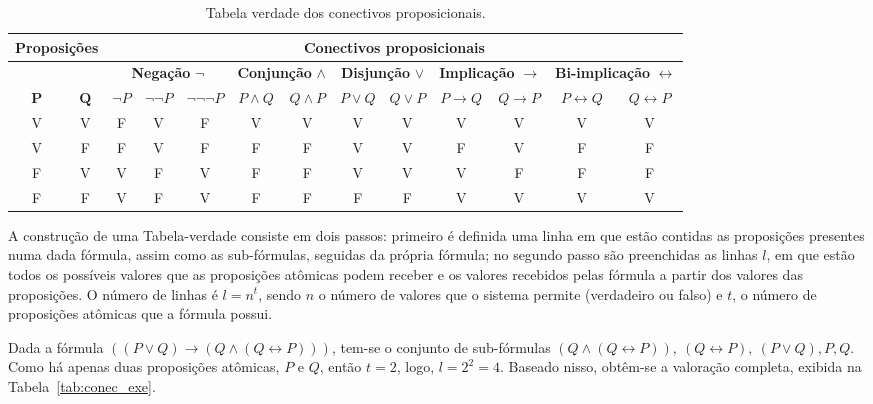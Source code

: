 \begin{table}[!ht]
	\centering\tiny{
		\caption{Tabela verdade dos conectivos proposicionais. \label{tab:conectivos}}
\begin{tabular}{|c|c|c|c|c|c|c|c|c|c|c|c|c|}
	\hline 
	\multicolumn{2}{|c|}{\textbf{Proposições}}  & \multicolumn{11}{c|}{\textbf{Conectivos proposicionais}} \\ 
	\hline
	\multicolumn{2}{|c|}{} 
	& \multicolumn{3}{c|}{\textbf{Negação} $\neg$} & \multicolumn{2}{c|}{\textbf{Conjunção} $\wedge$}  & \multicolumn{2}{c|}{\textbf{Disjunção} $\vee$}  & \multicolumn{2}{c|}{\textbf{Implicação} $\rightarrow$}  & \multicolumn{2}{c|}{\textbf{Bi-implicação} $\leftrightarrow$}   \\ 
	\hline 
	$~~\textbf{P}~~$ & $\textbf{Q}$ & $\neg P$ & $\neg \neg P$ & $\neg \neg \neg P$ & $P \wedge Q$ & $Q \wedge P$ & $P \vee Q$ & $Q \vee P$ & $P \rightarrow Q$ & $Q \rightarrow P$ & $P \leftrightarrow Q$ & $Q \leftrightarrow P$ \\ 
	\hline 
	V & V & F & V & F & V & V & V & V & V & V & V & V \\ 
	\hline 
	V & F & F & V & F & F & F & V & V & F & V & F & F \\ 
	\hline 
	F & V & V & F & V & F & F & V & V & V & F & F & F \\ 
	\hline 
	F & F & V & F & V & F & F & F & F & V & V & V & V \\ 
	\hline 
\end{tabular}   
	}
\end{table}

A construção de uma Tabela-verdade consiste em dois passos: primeiro é definida uma linha em que estão contidas as proposições presentes numa dada fórmula, assim como as sub-fórmulas, seguidas da própria fórmula; no segundo passo são preenchidas as linhas $l$, em que estão todos os possíveis valores que as proposições atômicas podem receber e os valores recebidos pelas fórmula a partir dos valores das proposições. O número de linhas é $l = n^{t}$, sendo $n$ o número de valores que o sistema permite (verdadeiro ou falso) e $t$, o número de proposições atômicas que a fórmula possui.

Dada a fórmula $((P \vee Q)\rightarrow (Q \wedge (Q \leftrightarrow P)))$, tem-se o conjunto de sub-fórmulas ${(Q \wedge (Q \leftrightarrow P)),~(Q \leftrightarrow P),~(P \vee Q), P, Q}$. Como há apenas duas proposições atômicas, $P$ e $Q$, então $t = 2$, logo, $l = 2^{2} = 4$. Baseado nisso, obtêm-se a valoração completa, exibida na Tabela~\ref{tab:conec_exe}.

